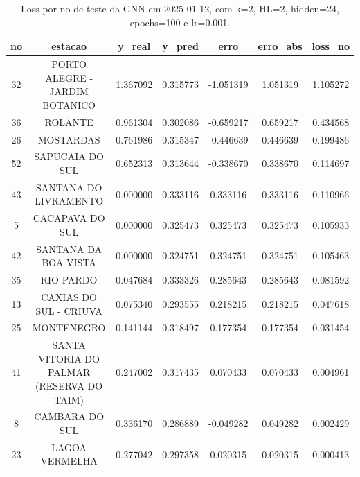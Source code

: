 \begin{table}[h]
\centering
\caption{Loss por no de teste da GNN em 2025-01-12, com k=2, HL=2, hidden=24, epochs=100 e lr=0.001.}
\label{tab:gnn_loss_k2_hl2_h24_e100_d20250112}
\begin{tabular}{ccccccc}
\toprule
no & estacao & y\_real & y\_pred & erro & erro\_abs & loss\_no \\
\midrule
32 & PORTO ALEGRE - JARDIM BOTANICO & 1.367092 & 0.315773 & -1.051319 & 1.051319 & 1.105272 \\
36 & ROLANTE & 0.961304 & 0.302086 & -0.659217 & 0.659217 & 0.434568 \\
26 & MOSTARDAS & 0.761986 & 0.315347 & -0.446639 & 0.446639 & 0.199486 \\
52 & SAPUCAIA DO SUL & 0.652313 & 0.313644 & -0.338670 & 0.338670 & 0.114697 \\
43 & SANTANA DO LIVRAMENTO & 0.000000 & 0.333116 & 0.333116 & 0.333116 & 0.110966 \\
5 & CACAPAVA DO SUL & 0.000000 & 0.325473 & 0.325473 & 0.325473 & 0.105933 \\
42 & SANTANA DA BOA VISTA & 0.000000 & 0.324751 & 0.324751 & 0.324751 & 0.105463 \\
35 & RIO PARDO & 0.047684 & 0.333326 & 0.285643 & 0.285643 & 0.081592 \\
13 & CAXIAS DO SUL - CRIUVA & 0.075340 & 0.293555 & 0.218215 & 0.218215 & 0.047618 \\
25 & MONTENEGRO & 0.141144 & 0.318497 & 0.177354 & 0.177354 & 0.031454 \\
41 & SANTA VITORIA DO PALMAR (RESERVA DO TAIM) & 0.247002 & 0.317435 & 0.070433 & 0.070433 & 0.004961 \\
8 & CAMBARA DO SUL & 0.336170 & 0.286889 & -0.049282 & 0.049282 & 0.002429 \\
23 & LAGOA VERMELHA & 0.277042 & 0.297358 & 0.020315 & 0.020315 & 0.000413 \\
\bottomrule
\end{tabular}
\end{table}
